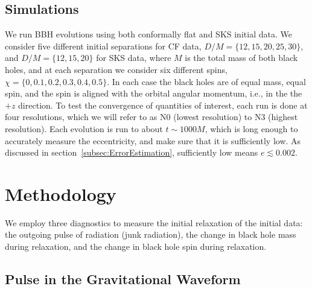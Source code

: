 
\subsection{Simulations}

We run BBH evolutions using both conformally flat and SKS initial
data.  We consider five different initial separations for CF data,
$D/M=\{12,15,20,25,30\}$, and $D/M=\{12,15,20\}$ for SKS data, where $M$ is the total mass of both black
holes, and at each separation we consider  six different spins,
$\chi=\{0,0.1,0.2,0.3,0.4,0.5\}$. In each case the black holes are of
equal mass, equal spin, and the spin is aligned with the orbital
angular momentum, i.e., in the the $+z$ direction. To test the
convergence of quantities of interest, each run is done at four
resolutions, which we will refer to as N0 (lowest resolution) to N3
(highest resolution). Each evolution is
run to about $t\sim1000M$, which is long enough to accurately measure the
eccentricity, and make sure that it is sufficiently low. As discussed in
section~\ref{subsec:ErrorEstimation}, sufficiently low means
$e\lesssim 0.002$.

\section{Methodology}
\label{sec:Methodology}

We employ three diagnostics to measure the initial relaxation of
the initial data: the outgoing pulse of radiation (junk radiation),
the change in black hole mass during relaxation, and the change in
black hole spin during relaxation.



\subsection{Pulse in the Gravitational Waveform}

